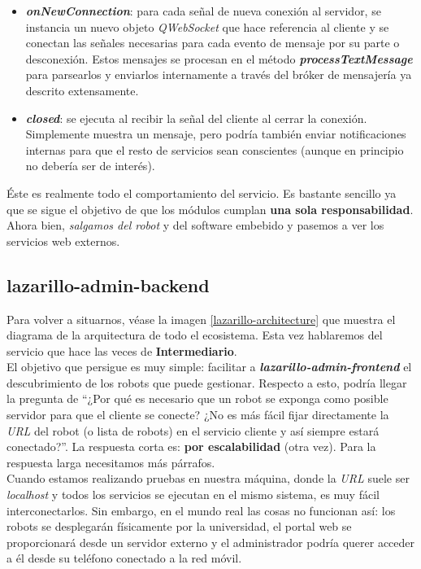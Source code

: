 \begin{itemize}
	\item \textbf{\textit{onNewConnection}}: para cada señal de nueva conexión al servidor, se instancia un nuevo objeto \emph{QWebSocket} que hace referencia al cliente y se conectan las señales necesarias para cada evento de mensaje por su parte o desconexión. Estos mensajes se procesan en el método \textbf{\textit{processTextMessage}} para parsearlos y enviarlos internamente a través del bróker de mensajería ya descrito extensamente.
	\item \textbf{\textit{closed}}: se ejecuta al recibir la señal del cliente al cerrar la conexión. Simplemente muestra un mensaje, pero podría también enviar notificaciones internas para que el resto de servicios sean conscientes (aunque en principio no debería ser de interés).
\end{itemize}

Éste es realmente todo el comportamiento del servicio. Es bastante sencillo ya que se sigue el objetivo de que los módulos cumplan \textbf{una sola responsabilidad}.\\

Ahora bien, \textit{salgamos del robot} y del software embebido y pasemos a ver los servicios web externos.\\


\subsection{lazarillo-admin-backend}

Para volver a situarnos, véase la imagen \ref{lazarillo-architecture} que muestra el diagrama de la arquitectura de todo el ecosistema. Esta vez hablaremos del servicio que hace las veces de \textbf{Intermediario}.\\

El objetivo que persigue es muy simple: facilitar a \textbf{\textit{lazarillo-admin-frontend}} el descubrimiento de los robots que puede gestionar. Respecto a esto, podría llegar la pregunta de ``¿Por qué es necesario que un robot se exponga como posible servidor para que el cliente se conecte? ¿No es más fácil fijar directamente la \textit{URL} del robot (o lista de robots) en el servicio cliente y así siempre estará conectado?''. La respuesta corta es: \textbf{por escalabilidad} (otra vez). Para la respuesta larga necesitamos más párrafos.\\

Cuando estamos realizando pruebas en nuestra máquina, donde la \textit{URL} suele ser \textit{localhost} y todos los servicios se ejecutan en el mismo sistema, es muy fácil interconectarlos. Sin embargo, en el mundo real las cosas no funcionan así: los robots se desplegarán físicamente por la universidad, el portal web se proporcionará desde un servidor externo y el administrador podría querer acceder a él desde su teléfono conectado a la red móvil.\\

